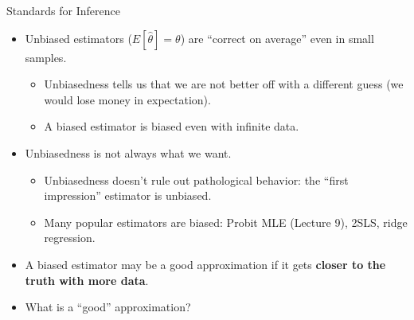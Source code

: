\documentclass[handout, aspectratio=169]{beamer}
\numberwithin{equation}{section}
\begin{document}
\begin{frame}{Standards for Inference}
\begin{itemize}
\item Unbiased estimators ($E[\hat{\theta}]=\theta$) are ``correct on average'' even in small samples.
\begin{itemize}
\item Unbiasedness tells us that we are not better off with a different guess (we would lose money in expectation).
\item A biased estimator is biased even with infinite data.
\end{itemize}
\pause
\item Unbiasedness is not always what we want.
\begin{itemize}
\item Unbiasedness doesn't rule out pathological behavior: the ``first impression'' estimator is unbiased.
\item Many popular estimators are biased: Probit MLE (Lecture 9), 2SLS, ridge regression.\pause
\end{itemize}
\item A biased estimator may be a good approximation if it gets \textbf{closer to the truth with more data}.
\item What is a ``good'' approximation?
\end{itemize}
\end{frame}

\end{document}
